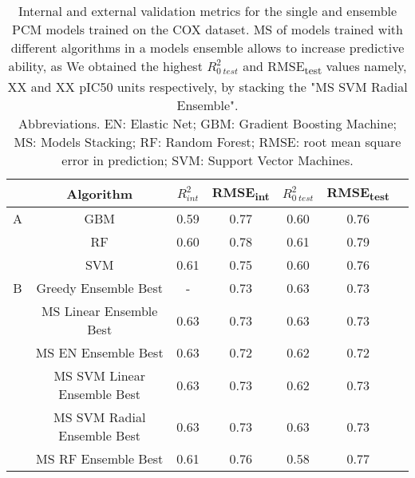 \begin{table}[!htb]
\centering
\begin{tabular}[0.5width=\textwidth]{cccccc p{1cm}}
\hline
& Algorithm & $R^{2}_{int}$ & RMSE\textsubscript{int} & $R^{2}_{0\ test}$ & RMSE\textsubscript{test}\\
\hline
A &  GBM & 0.59 & 0.77 & 0.60 & 0.76 \\
 &  RF & 0.60 & 0.78 & 0.61 & 0.79 \\
 &  SVM & 0.61 & 0.75 & 0.60 & 0.76 \\
\hline
B & Greedy Ensemble Best & - & 0.73  & 0.63 & 0.73 \\
 & MS Linear Ensemble Best & 0.63 & 0.73 &  0.63 & 0.73 \\
 & MS EN Ensemble Best & 0.63  & 0.72 & 0.62 & 0.72  \\
 & MS SVM Linear Ensemble Best &0.63 & 0.73 & 0.62 & 0.73 \\
 & MS SVM Radial Ensemble Best & 0.63 & 0.73 & 0.63 & 0.73 \\
 & MS RF Ensemble Best & 0.61 & 0.76 & 0.58 & 0.77 \\
\hline
\end{tabular}
\caption{Internal and external validation metrics for the single and ensemble PCM models trained on the COX dataset. 
MS of models trained with different algorithms in a models ensemble allows to increase predictive ability,
as 
We obtained the highest $R^{2}_{0\ test}$ and RMSE\textsubscript{test} values namely, XX and XX pIC50 units respectively, 
by stacking the "MS SVM Radial Ensemble".\\
Abbreviations.
EN: Elastic Net; 
GBM: Gradient Boosting Machine;
MS: Models Stacking;
RF: Random Forest;
RMSE: root mean square error in prediction;
SVM: Support Vector Machines.}
\label{tab:resultsCOX}
\end{table}
